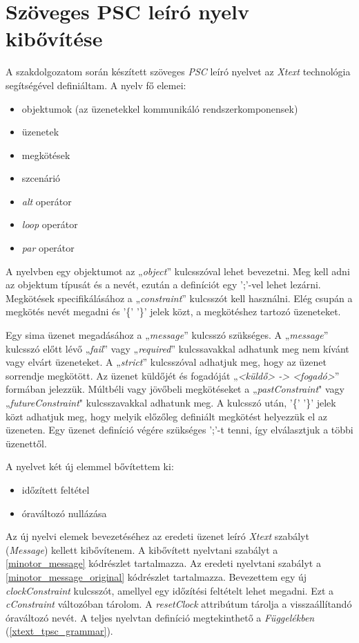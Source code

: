 \chapter{Szöveges PSC leíró nyelv kibővítése}

A szakdolgozatom során készített szöveges \textit{PSC} leíró nyelvet \cite{Bakai} az \textit{Xtext} technológia segítségével definiáltam.
A nyelv fő elemei:
\begin{itemize}
    \item objektumok (az üzenetekkel kommunikáló rendszerkomponensek)
    \item üzenetek
    \item megkötések
    \item szcenárió
    \item \textit{alt} operátor
    \item \textit{loop} operátor
    \item \textit{par} operátor
\end{itemize}

A nyelvben egy objektumot az „\textit{object}” kulcsszóval lehet bevezetni.
Meg kell adni az objektum típusát és a nevét, ezután a definíciót egy ’;’-vel lehet lezárni.
Megkötések specifikálásához a „\textit{constraint}” kulcsszót kell használni.
Elég csupán a megkötés nevét megadni és '\{' '\}' jelek közt, a megkötéshez tartozó üzeneteket.

Egy sima üzenet megadásához a „\textit{message}” kulcsszó szükséges.
A „\textit{message}” kulcsszó előtt lévő „\textit{fail}” vagy „\textit{required}” kulcssavakkal adhatunk meg nem kívánt vagy elvárt üzeneteket.
A „\textit{strict}” kulcsszóval adhatjuk meg, hogy az üzenet sorrendje megkötött.
Az üzenet küldőjét és fogadóját „\textit{<küldő> -> <fogadó>}” formában jelezzük.
Múltbéli vagy jövőbeli megkötéseket a „\textit{pastConstraint}" vagy „\textit{futureConstraint}" kulcsszavakkal adhatunk meg.
A kulcsszó után, '\{' '\}' jelek közt adhatjuk meg, hogy melyik előzőleg definiált megkötést helyezzük el az üzeneten.
Egy üzenet definíció végére szükséges ’;’-t tenni, így elválasztjuk a többi üzenettől.

A nyelvet két új elemmel bővítettem ki:
\begin{itemize}
    \item időzített feltétel
    \item óraváltozó nullázása
\end{itemize}
Az új nyelvi elemek bevezetéséhez az eredeti üzenet leíró \textit{Xtext} szabályt (\textit{Message}) kellett kibővítenem.
A kibővített nyelvtani szabályt a \ref{minotor_message} kódrészlet tartalmazza.
Az eredeti nyelvtani szabályt a \ref{minotor_message_original} kódrészlet tartalmazza.
Bevezettem egy új \textit{clockConstraint} kulcsszót, amellyel egy időzítési feltételt lehet megadni.
Ezt a \textit{cConstraint} változóban tárolom.
A \textit{resetClock} attribútum tárolja a visszaállítandó óraváltozó nevét.
A teljes nyelvtan definíció megtekinthető a \textit{Függelékben} (\ref{xtext_tpsc_grammar}).


